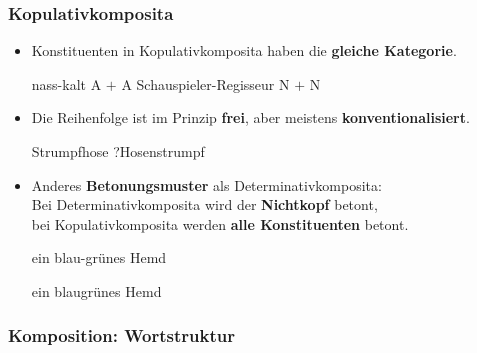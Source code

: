 \begin{frame}
\frametitle{Kopulativkomposita}

\begin{itemize}
	\item Konstituenten in Kopulativkomposita haben die \textbf{gleiche Kategorie}.
	
	\ea 
		\ea nass-kalt \ras A $+$ A
		\ex Schauspieler-Regisseur \ras N $+$ N
		\z 
	\z 

\pause 
	
	\item Die Reihenfolge ist im Prinzip \textbf{frei}, aber meistens \textbf{konventionalisiert}.
	
	\ea Strumpfhose \vs ?Hosenstrumpf
	\z 

\pause 
	
	\item Anderes \textbf{Betonungsmuster} als Determinativkomposita: \\
	Bei Determinativkomposita wird der \textbf{Nichtkopf} betont, \\
	bei Kopulativkomposita werden \textbf{alle Konstituenten} betont.
	
	\settowidth{} 
	\ea 
		\ea ein \textprimstress blau-\textprimstress grünes \textprimstress Hemd  \jambox{[Kopulativkompositum]}
	
		\ex ein \textprimstress blaugrünes \textprimstress Hemd \jambox{[Determinativkompositum]}
		\z 
	\z

\end{itemize}


\end{frame}


\subsubsection{Komposition: Wortstruktur}


